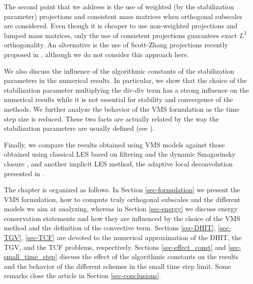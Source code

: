 The second point that we address is the use of weighted (by the stabilization parameter) projections and consistent mass matrices when orthogonal subscales are considered. Even though it is cheaper to use non-weighted projections and lumped mass matrices, only the use of consistent projections guarantees exact $L^2$ orthogonality. An alternative is the use of Scott-Zhang projections recently proposed in \cite{Badia2012}, although we do not consider this approach here.

We also discuss the influence of the algorithmic constants of the stabilization parameters in the numerical results. In particular, we show that the choice of the stabilization parameter multiplying the div-div term has a strong influence on the numerical results while it is not essential for stability and convergence of the methods. We further analyze the behavior of the VMS formulation as the time step size is reduced. These two facts are actually related by the way the stabilization parameters are usually defined (see \cite{gamnitzer_time-dependent_2010,Hsu2010}).

Finally, we compare the results obtained using VMS models against those obtained using classical LES based on filtering and the dynamic Smagorinsky closure \cite{fauconnier_construction_2009}, and another implicit LES method, the adaptive local deconvolution presented in \cite{hickel_adaptive_2006}. 

The chapter is organized as follows. In Section \ref{sec-formulation} we present the VMS formulation, how to compute truly orthogonal subscales and the different models we aim at analyzing, whereas in Section \ref{sec-energy} we discuss energy conservation statements and how they are influenced by the choice of the VMS method and the definition of the convective term. Sections \ref{sec-DHIT},  \ref{sec-TGV},  \ref{sec-TCF} are devoted to the numerical approximation of the DHIT, the TGV, and the TCF problems, respectively. Sections \ref{sec-effect_const} and \ref{sec-small_time_step} discuss the effect of the algorithmic constants on the results and the behavior of the different schemes in the small time step limit. Some remarks close the article in Section \ref{sec-conclusions}.

